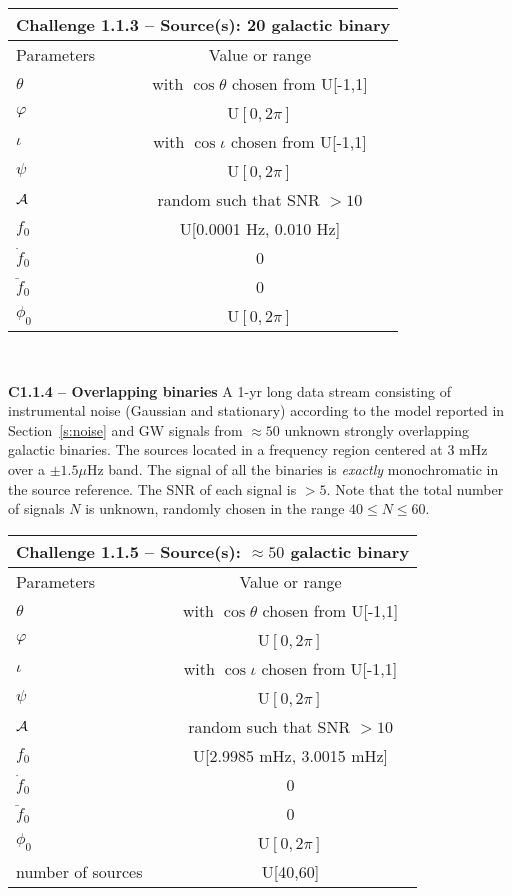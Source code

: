 \documentclass[11pt]{report}
\begin{document}
\begin{description}
\begin{center}
\begin{tabular}{l|c}
\hline \hline
\multicolumn{2}{c}{{\bf Challenge 1.1.3 -- Source(s): 20 galactic binary}} \\
\hline
Parameters & Value or range \\
\hline
$\theta$          & with $\cos\theta$ chosen from U[-1,1]\\
$\varphi$         & U$[0,2\pi]$ \\ 
$\iota$           & with $\cos\iota$ chosen from U[-1,1]\\ 
$\psi$            & U$[0,2\pi]$ \\
${\cal A}$        & random such that SNR $> 10$  \\
$f_0$             & U[0.0001 Hz, 0.010 Hz] \\ 
$\dot{f}_0$       & 0 \\ 
$\ddot{f}_0$      & 0\\ 
$\phi_0$          & U$[0,2\pi]$ \\
\hline \hline
\end{tabular} \\
\end{center}

\item {\bf C1.1.4 -- Overlapping binaries} A 1-yr long data stream consisting of instrumental noise (Gaussian and stationary) according to the model reported in Section~\ref{s:noise} and GW signals from $\approx 50$ unknown strongly overlapping galactic binaries. The sources located in a frequency region centered at 3 mHz over a $\pm 1.5 \mu$Hz band. The signal of all the binaries is {\em exactly} monochromatic in the source reference. The SNR of each signal is $> 5$. Note that the total number of signals $N$ is unknown, randomly chosen in the range $40 \le N \le 60$.

\begin{center}
\begin{tabular}{l|c}
\hline \hline
\multicolumn{2}{c}{{\bf Challenge 1.1.5 -- Source(s): $\approx 50$ galactic binary}} \\
\hline
Parameters & Value or range \\
\hline
$\theta$          & with $\cos\theta$ chosen from U[-1,1]\\
$\varphi$         & U$[0,2\pi]$ \\ 
$\iota$           & with $\cos\iota$ chosen from U[-1,1]\\ 
$\psi$            & U$[0,2\pi]$ \\
${\cal A}$        & random such that SNR $> 10$  \\
$f_0$             & U[2.9985 mHz, 3.0015 mHz] \\ 
$\dot{f}_0$       & 0 \\ 
$\ddot{f}_0$      & 0\\ 
$\phi_0$          & U$[0,2\pi]$ \\
number of sources & U[40,60] \\
\hline \hline
\end{tabular} \\
\end{center}


\end{description}
\end{document}
